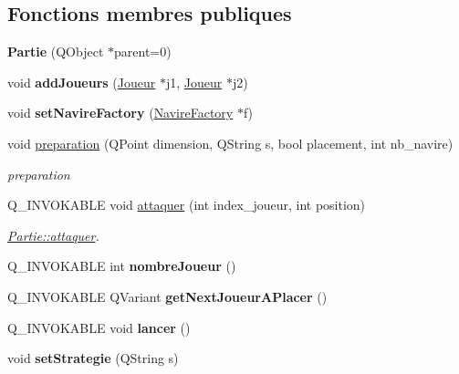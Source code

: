\subsection*{Fonctions membres publiques}
\begin{DoxyCompactItemize}
\item 
{\bfseries Partie} (Q\+Object $\ast$parent=0)\hypertarget{class_partie_a0d540b2932dcd0e53841d7ef079068fa}{}\label{class_partie_a0d540b2932dcd0e53841d7ef079068fa}

\item 
void {\bfseries add\+Joueurs} (\hyperlink{class_joueur}{Joueur} $\ast$j1, \hyperlink{class_joueur}{Joueur} $\ast$j2)\hypertarget{class_partie_a2c87a8323f8b2e90e122027717727e5b}{}\label{class_partie_a2c87a8323f8b2e90e122027717727e5b}

\item 
void {\bfseries set\+Navire\+Factory} (\hyperlink{class_navire_factory}{Navire\+Factory} $\ast$f)\hypertarget{class_partie_a1b37cfa4baa6858c4bcb28de91ebd968}{}\label{class_partie_a1b37cfa4baa6858c4bcb28de91ebd968}

\item 
void \hyperlink{class_partie_afc96e2ca2cc71d244fa5f9b219f10d63}{preparation} (Q\+Point dimension, Q\+String s, bool placement, int nb\+\_\+navire)
\begin{DoxyCompactList}\small\item\em preparation \end{DoxyCompactList}\item 
Q\+\_\+\+I\+N\+V\+O\+K\+A\+B\+LE void \hyperlink{class_partie_a0bb3dd78c418401764f64a047cc865db}{attaquer} (int index\+\_\+joueur, int position)
\begin{DoxyCompactList}\small\item\em \hyperlink{class_partie_a0bb3dd78c418401764f64a047cc865db}{Partie\+::attaquer}. \end{DoxyCompactList}\item 
Q\+\_\+\+I\+N\+V\+O\+K\+A\+B\+LE int {\bfseries nombre\+Joueur} ()\hypertarget{class_partie_a0794b94a8673a8270dfe78c8520d9a7b}{}\label{class_partie_a0794b94a8673a8270dfe78c8520d9a7b}

\item 
Q\+\_\+\+I\+N\+V\+O\+K\+A\+B\+LE Q\+Variant {\bfseries get\+Next\+Joueur\+A\+Placer} ()\hypertarget{class_partie_a9cf5798d985bfb538895057c5a6b650a}{}\label{class_partie_a9cf5798d985bfb538895057c5a6b650a}

\item 
Q\+\_\+\+I\+N\+V\+O\+K\+A\+B\+LE void {\bfseries lancer} ()\hypertarget{class_partie_a932d5700f97a39216697feff60960b1b}{}\label{class_partie_a932d5700f97a39216697feff60960b1b}

\item 
void {\bfseries set\+Strategie} (Q\+String s)\hypertarget{class_partie_a77bcc0a53bd522d2deb957205115ebbf}{}\label{class_partie_a77bcc0a53bd522d2deb957205115ebbf}

\end{DoxyCompactItemize}
